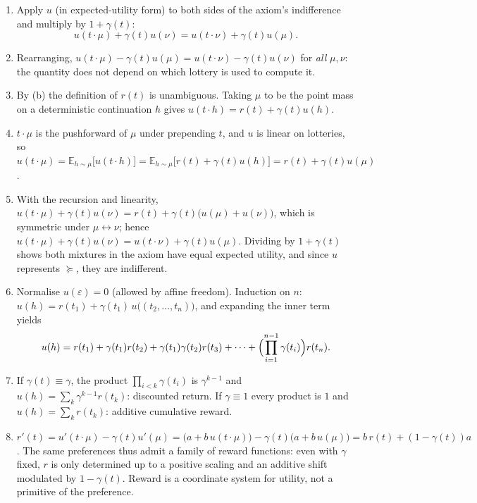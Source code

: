 \documentclass[11pt]{article}
\newcommand{\pref}{\succcurlyeq}
\newcommand{\emptytraj}{\varepsilon}
\begin{document}
\begin{solution}
\begin{enumerate}[label=(\alph*)]
\item Apply $u$ (in expected-utility form) to both sides of the axiom's
indifference and multiply by $1+\gamma(t)$:
\[
u(t\cdot\mu)+\gamma(t)u(\nu)=u(t\cdot\nu)+\gamma(t)u(\mu).
\]
\item Rearranging, $u(t\cdot\mu)-\gamma(t)u(\mu)=u(t\cdot\nu)-\gamma(t)u(\nu)$
for \emph{all} $\mu,\nu$: the quantity does not depend on which lottery is
used to compute it.
\item By (b) the definition of $r(t)$ is unambiguous. Taking $\mu$ to be the
point mass on a deterministic continuation $h$ gives
$u(t\cdot h)=r(t)+\gamma(t)u(h)$.
\item $t\cdot\mu$ is the pushforward of $\mu$ under prepending $t$, and $u$
is linear on lotteries, so
$u(t\cdot\mu)=\mathbb{E}_{h\sim\mu}\bigl[u(t\cdot h)\bigr]
=\mathbb{E}_{h\sim\mu}\bigl[r(t)+\gamma(t)u(h)\bigr]=r(t)+\gamma(t)u(\mu)$.
\item With the recursion and linearity,
$u(t\cdot\mu)+\gamma(t)u(\nu)=r(t)+\gamma(t)\bigl(u(\mu)+u(\nu)\bigr)$,
which is symmetric under $\mu\leftrightarrow\nu$; hence
$u(t\cdot\mu)+\gamma(t)u(\nu)=u(t\cdot\nu)+\gamma(t)u(\mu)$. Dividing by
$1+\gamma(t)$ shows both mixtures in the axiom have equal expected utility,
and since $u$ represents $\pref$, they are indifferent.
\item Normalise $u(\emptytraj)=0$ (allowed by affine freedom). Induction on
$n$: $u(h)=r(t_1)+\gamma(t_1)\,u\bigl((t_2,\dots,t_n)\bigr)$, and expanding
the inner term yields
\[
u(h)=r(t_1)+\gamma(t_1)r(t_2)+\gamma(t_1)\gamma(t_2)r(t_3)+\cdots+
\Bigl(\prod_{i=1}^{n-1}\gamma(t_i)\Bigr)r(t_n).
\]
\item If $\gamma(t)\equiv\gamma$, the product $\prod_{i<k}\gamma(t_i)$ is
$\gamma^{k-1}$ and $u(h)=\sum_k \gamma^{k-1}r(t_k)$: discounted return. If
$\gamma\equiv 1$ every product is $1$ and $u(h)=\sum_k r(t_k)$: additive
cumulative reward.
\item $r'(t)=u'(t\cdot\mu)-\gamma(t)u'(\mu)
=\bigl(a+b\,u(t\cdot\mu)\bigr)-\gamma(t)\bigl(a+b\,u(\mu)\bigr)
=b\,r(t)+(1-\gamma(t))a$. The same preferences thus admit a family of reward
functions: even with $\gamma$ fixed, $r$ is only determined up to a positive
scaling and an additive shift modulated by $1-\gamma(t)$. Reward is a
coordinate system for utility, not a primitive of the preference.
\end{enumerate}
\end{solution}
\end{document}
